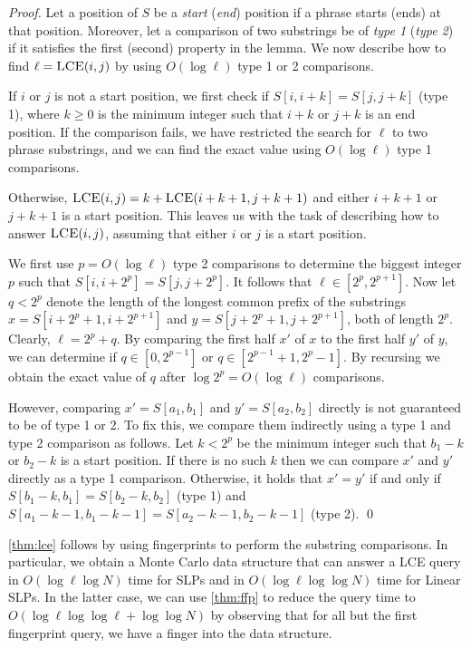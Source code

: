 \begin{proof}
Let a position of $S$ be a \emph{start} (\emph{end}) position if a phrase starts (ends) at that position. Moreover, let a comparison of two substrings be of \emph{type 1} (\emph{type 2}) if it satisfies the first (second) property in the lemma. We now describe how to find $\ell = \textsc{LCE}(i,j)$ by using $O(\log \ell)$ type 1 or 2 comparisons.

If $i$ or $j$ is not a start position, we first check if $S[i,i+k] = S[j,j+k]$ (type 1), where $k \geq 0$ is the minimum integer such that $i+k$ or $j+k$ is an end position. If the comparison fails, we have restricted the search for $\ell$ to two phrase substrings, and we can find the exact value using $O(\log \ell)$ type 1 comparisons.

Otherwise, $\textsc{LCE}(i,j) = k + \textsc{LCE}(i+k+1,j+k+1)$ and either $i+k+1$ or $j+k+1$ is a start position. This leaves us with the task of describing how to answer $\textsc{LCE}(i,j)$, assuming that either $i$ or $j$ is a start position.

We first use $p=O(\log \ell)$ type 2 comparisons to determine the biggest integer $p$ such that $S[i , i+2^p] = S[j , j+2^p]$. It follows that $\ell \in [2^p, 2^{p+1}]$. Now let $q<2^p$ denote the length of the longest common prefix of the substrings $x=S[i+2^p+1 , i+2^{p+1}]$ and $y=S[j+2^p+1 , j+2^{p+1}]$, both of length $2^p$. Clearly, $\ell = 2^p + q$. By comparing the first half $x'$ of $x$ to the first half $y'$ of $y$, we can determine if $q \in [0,2^{p-1}]$ or $q \in [2^{p-1}+1,2^p-1]$. By recursing we obtain the exact value of $q$ after $\log 2^p = O(\log \ell)$ comparisons.

However, comparing $x'=S[a_1,b_1]$ and $y'=S[a_2,b_2]$ directly is not guaranteed to be of type 1 or 2. To fix this, we compare them indirectly using a type 1 and type 2 comparison as follows. Let $k < 2^p$ be the minimum integer such that $b_1-k$ or $b_2-k$ is a start position. If there is no such $k$ then we can compare $x'$ and $y'$ directly as a type 1 comparison. Otherwise, it holds that $x' = y'$ if and only if $S[b_1-k,b_1] = S[b_2-k,b_2]$ (type 1) and $S[a_1-k-1,b_1-k-1] = S[a_2-k-1,b_2-k-1]$ (type 2).
\qed
\end{proof}

\noindent \autoref{thm:lce} follows by using fingerprints to perform the substring comparisons. In particular, we obtain a Monte Carlo data structure that can answer a LCE query in $O(\log\ell \log N)$ time for SLPs and in $O(\log \ell \log\log N)$ time for Linear SLPs. In the latter case, we can use \autoref{thm:ffp} to reduce the query time to $O(\log\ell\log\log\ell + \log\log N)$ by observing that for all but the first fingerprint query, we have a finger into the data structure. 



